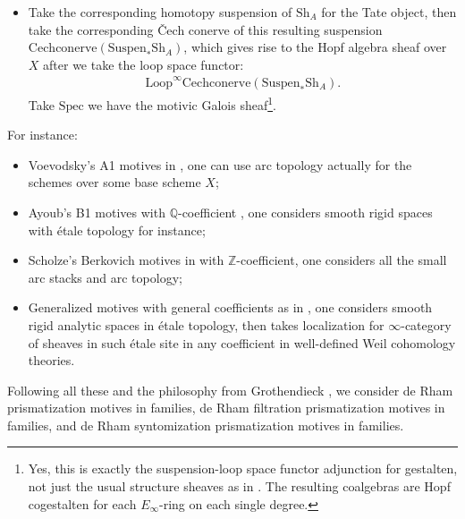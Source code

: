 \documentclass[12pt]{article}
\theoremstyle{definition}
\begin{document}
\begin{itemize}
\item[5] Take the corresponding homotopy suspension of $\mathrm{Sh}_A$ for the Tate object, then take the corresponding \v{C}ech conerve of this resulting suspension $\mathrm{Cechconerve}(\mathrm{Suspen}_*\mathrm{Sh}_A)$, which gives rise to the Hopf algebra sheaf over $X$ after we take the loop space functor:
\begin{align}
\mathrm{Loop}^\infty\mathrm{{Cechconerve}}(\mathrm{Suspen}_*\mathrm{Sh}_A).
\end{align} 
Take $\mathrm{Spec}$ we have the motivic Galois sheaf\footnote{Yes, this is exactly the suspension-loop space functor adjunction for gestalten, not just the usual structure sheaves as in \cite{31A}. The resulting coalgebras are Hopf cogestalten for each $E_\infty$-ring on each single degree.}.
\end{itemize}
For instance:
\begin{itemize}\setlength{\itemsep}{-0.1cm}
\item[M1] Voevodsky's A1 motives in \cite{3V}, one can use arc topology actually for the schemes over some base scheme $X$;
\item[M2] Ayoub's B1 motives with $\mathbb{Q}$-coefficient \cite{31A}, one considers smooth rigid spaces with \'etale topology for instance;
\item[M3] Scholze's Berkovich motives in \cite{3S} with $\mathbb{Z}$-coefficient, one considers all the small arc stacks and arc topology;
\item[M4] Generalized motives with general coefficients as in \cite{3A}, one considers smooth rigid analytic spaces in \'etale topology, then takes localization for $\infty$-category of sheaves in such \'etale site in any coefficient in well-defined Weil cohomology theories.
\end{itemize}
Following all these and the philosophy from Grothendieck \cite{3G}, we consider de Rham prismatization motives in families, de Rham filtration prismatization motives in families, and de Rham syntomization prismatization motives in families.
\end{document}
